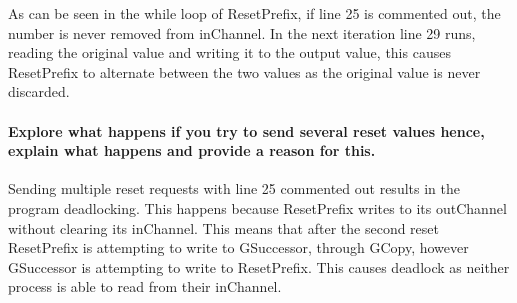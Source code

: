 
As can be seen in the while loop of ResetPrefix, if line 25 is commented out, the number is never removed from inChannel.  In the next iteration line 29 runs, reading the original value and writing it to the output value, this causes ResetPrefix to alternate between the two values as the original value is never discarded.

\paragraph{Explore what happens if you try to send several reset values hence, explain what happens and provide a reason for this.}

Sending multiple reset requests with line 25 commented out results in the program deadlocking.  This happens because ResetPrefix writes to its outChannel without clearing its inChannel.  This means that after the second reset ResetPrefix is attempting to write to GSuccessor, through GCopy, however GSuccessor is attempting to write to ResetPrefix.  This causes deadlock as neither process is able to read from their inChannel.